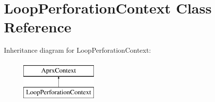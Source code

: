 \hypertarget{classLoopPerforationContext}{}\section{Loop\+Perforation\+Context Class Reference}
\label{classLoopPerforationContext}
Inheritance diagram for Loop\+Perforation\+Context\+:\begin{figure}[H]
\begin{center}
\leavevmode
\includegraphics[height=2.000000cm]{classLoopPerforationContext}
\end{center}
\end{figure}

